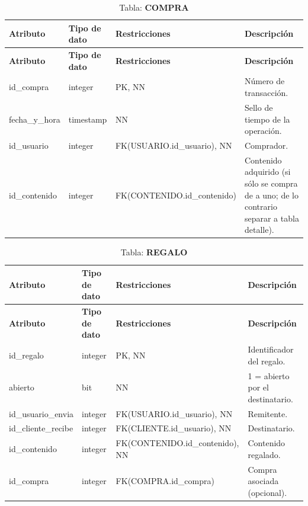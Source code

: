 \begin{longtable}{|l|l|p{5cm}|p{5cm}|}
\caption{Tabla: \textbf{COMPRA}}\\ \hline
\textbf{Atributo} & \textbf{Tipo de dato} & \textbf{Restricciones} & \textbf{Descripción} \\ \hline
\endfirsthead
\hline \textbf{Atributo} & \textbf{Tipo de dato} & \textbf{Restricciones} & \textbf{Descripción} \\ \hline
\endhead
id\_compra     & integer   & PK, NN & Número de transacción. \\ \hline
fecha\_y\_hora & timestamp & NN     & Sello de tiempo de la operación. \\ \hline
id\_usuario    & integer   & FK(USUARIO.id\_usuario), NN & Comprador. \\ \hline
id\_contenido  & integer   & FK(CONTENIDO.id\_contenido) & Contenido adquirido (si sólo se compra de a uno; de lo contrario separar a tabla detalle). \\ \hline
\end{longtable}

\begin{longtable}{|l|l|p{5cm}|p{5cm}|}
\caption{Tabla: \textbf{REGALO}}\\ \hline
\textbf{Atributo} & \textbf{Tipo de dato} & \textbf{Restricciones} & \textbf{Descripción} \\ \hline
\endfirsthead
\hline \textbf{Atributo} & \textbf{Tipo de dato} & \textbf{Restricciones} & \textbf{Descripción} \\ \hline
\endhead
id\_regalo         & integer & PK, NN & Identificador del regalo. \\ \hline
abierto            & bit     & NN & 1 = abierto por el destinatario. \\ \hline
id\_usuario\_envia & integer & FK(USUARIO.id\_usuario), NN & Remitente. \\ \hline
id\_cliente\_recibe& integer & FK(CLIENTE.id\_usuario), NN & Destinatario. \\ \hline
id\_contenido      & integer & FK(CONTENIDO.id\_contenido), NN & Contenido regalado. \\ \hline
id\_compra         & integer & FK(COMPRA.id\_compra) & Compra asociada (opcional). \\ \hline
\end{longtable}

